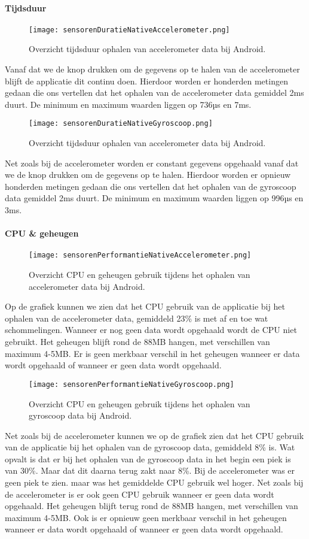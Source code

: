 \paragraph{Tijdsduur}
\begin{figure}[H]
    \centering
    \texttt{[image: sensorenDuratieNativeAccelerometer.png]}
    \caption{Overzicht tijdsduur ophalen van accelerometer data bij Android.}
\end{figure}
Vanaf dat we de knop drukken om de gegevens op te halen van de accelerometer blijft de applicatie
dit continu doen. Hierdoor worden er honderden metingen gedaan die ons vertellen dat het ophalen 
van de accelerometer data gemiddel 2ms duurt. De minimum en maximum waarden liggen op 736µs en 7ms.
\begin{figure}[H]
    \centering
    \texttt{[image: sensorenDuratieNativeGyroscoop.png]}
    \caption{Overzicht tijdsduur ophalen van accelerometer data bij Android.}
\end{figure}
Net zoals bij de accelerometer worden er constant gegevens opgehaald vanaf dat we de knop drukken om de 
gegevens op te halen. Hierdoor worden er opnieuw honderden metingen gedaan die ons vertellen dat het ophalen 
van de gyroscoop data gemiddel 2ms duurt. De minimum en maximum waarden liggen op 996µs en 3ms.

\paragraph{CPU \& geheugen}
\begin{figure}[H]
    \centering
    \texttt{[image: sensorenPerformantieNativeAccelerometer.png]}
    \caption{Overzicht CPU en geheugen gebruik tijdens het ophalen van accelerometer data bij Android.}
\end{figure}
Op de grafiek kunnen we zien dat het CPU gebruik van de applicatie bij het ophalen van de accelerometer data,
gemiddeld 23\% is met af en toe wat schommelingen. Wanneer er nog geen data wordt opgehaald wordt de CPU niet 
gebruikt. Het geheugen blijft rond de 88MB hangen, met verschillen van maximum 4-5MB. 
Er is geen merkbaar verschil in het geheugen wanneer er data wordt opgehaald of wanneer er 
geen data wordt opgehaald.
\begin{figure}[H]
    \centering
    \texttt{[image: sensorenPerformantieNativeGyroscoop.png]}
    \caption{Overzicht CPU en geheugen gebruik tijdens het ophalen van gyroscoop data bij Android.}
\end{figure}
Net zoals bij de accelerometer kunnen we op de grafiek zien dat het CPU gebruik van de applicatie bij het 
ophalen van de gyroscoop data, gemiddeld 8\% is. Wat opvalt is dat er bij het ophalen van de gyroscoop data
in het begin een piek is van 30\%. Maar dat dit daarna terug zakt naar 8\%. Bij de accelerometer was er geen
piek te zien. maar was het gemiddelde CPU gebruik wel hoger. Net zoals bij de accelerometer is er ook geen 
CPU gebruik wanneer er geen data wordt opgehaald. Het geheugen blijft terug rond de 88MB hangen, met 
verschillen van maximum 4-5MB. Ook is er opnieuw geen merkbaar verschil in het 
geheugen wanneer er data wordt opgehaald of wanneer er geen data wordt opgehaald.
  